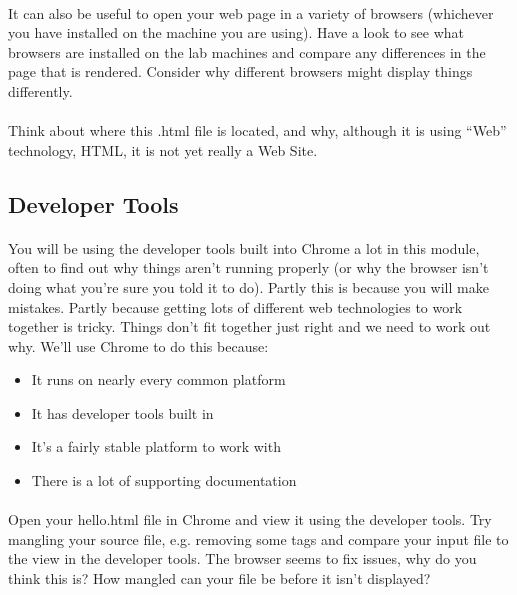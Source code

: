 \documentclass[10pt, a4paper]{article}
\begin{document}
\paragraph{} It can also be useful to open your web page in a variety of browsers (whichever you have installed on the machine you are using). Have a look to see what browsers are installed on the lab machines and compare any differences in the page that is rendered. Consider why different browsers might display things differently.

\paragraph{} Think about where this .html file is located, and why, although it is using ``Web'' technology, HTML, it is not yet really a Web Site.


\subsection{Developer Tools}
\paragraph{} You will be using the developer tools built into Chrome a lot in this module, often to find out why things aren't running properly (or why the browser isn't doing what you're sure you told it to do). Partly this is because you will make mistakes. Partly because getting lots of different web technologies to work together is tricky. Things don't fit together just right and we need to work out why. We'll use Chrome to do this because:

\begin{itemize}
\item It runs on nearly every common platform
\item It has developer tools built in
\item It's a fairly stable platform to work with
\item There is a lot of supporting documentation
\end{itemize}

\paragraph{} Open your hello.html file in Chrome and view it using the developer tools. Try mangling your source file, e.g. removing some tags and compare your input file to the view in the developer tools. The browser seems to fix issues, why do you think this is? How mangled can your file be before it isn't displayed? 
\end{document}
